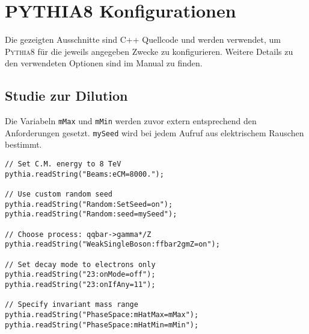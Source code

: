 


\chapter{\textsc{PYTHIA8} Konfigurationen}

Die gezeigten Ausschnitte sind C++ Quellcode und werden verwendet, um
\textsc{Pythia8} für die jeweils angegeben Zwecke zu konfigurieren. Weitere
Details zu den verwendeten Optionen sind im Manual zu finden.

\section{Studie zur Dilution}
\label{pythia8:dilution}
Die Variabeln \texttt{mMax} und \texttt{mMin} werden zuvor extern entsprechend
den Anforderungen gesetzt. \texttt{mySeed} wird bei jedem Aufruf aus
elektrischem Rauschen bestimmt.

\lstset{language=C++}
\begin{small}
\begin{lstlisting}[frame=single]
// Set C.M. energy to 8 TeV
pythia.readString("Beams:eCM=8000.");

// Use custom random seed
pythia.readString("Random:SetSeed=on");
pythia.readString("Random:seed=mySeed");

// Choose process: qqbar->gamma*/Z
pythia.readString("WeakSingleBoson:ffbar2gmZ=on");

// Set decay mode to electrons only
pythia.readString("23:onMode=off");
pythia.readString("23:onIfAny=11");

// Specify invariant mass range
pythia.readString("PhaseSpace:mHatMax=mMax");
pythia.readString("PhaseSpace:mHatMin=mMin");
\end{lstlisting}
\end{small}
